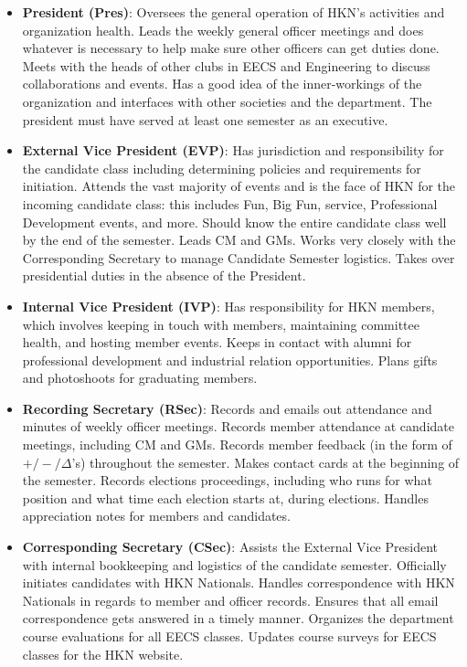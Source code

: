 \documentclass[11pt, article, oneside]{memoir}
\begin{document}
        \begin{itemize}
            \item \textbf{President (Pres)}: Oversees the general operation of HKN's activities and organization health. Leads the weekly general officer meetings and does whatever is necessary to help make sure other officers can get duties done. Meets with the heads of other clubs in EECS and Engineering to discuss collaborations and events. Has a good idea of the inner-workings of the organization and interfaces with other societies and the department. The president must have served at least one semester as an executive.
            \item \textbf{External Vice President (EVP)}: Has jurisdiction and responsibility for the candidate class including determining policies and requirements for initiation. Attends the vast majority of events and is the face of HKN for the incoming candidate class: this includes Fun, Big Fun, service, Professional Development events, and more. Should know the entire candidate class well by the end of the semester. Leads CM and GMs. Works very closely with the Corresponding Secretary to manage Candidate Semester logistics. Takes over presidential duties in the absence of the President.
            \item \textbf{Internal Vice President (IVP)}: Has responsibility for HKN members, which involves keeping in touch with members, maintaining committee health, and hosting member events. Keeps in contact with alumni for professional development and industrial relation opportunities. Plans gifts and photoshoots for graduating members. 
            \item \textbf{Recording Secretary (RSec)}: Records and emails out attendance and minutes of weekly officer meetings. Records member attendance at candidate meetings, including CM and GMs. Records member feedback (in the form of $+/-/\Delta$'s) throughout the semester. Makes contact cards at the beginning of the semester. Records elections proceedings, including who runs for what position and what time each election starts at, during elections. Handles appreciation notes for members and candidates. 
            \item \textbf{Corresponding Secretary (CSec)}: Assists the External Vice President with internal bookkeeping and logistics of the candidate semester. Officially initiates candidates with HKN Nationals. Handles correspondence with HKN Nationals in regards to member and officer records. Ensures that all email correspondence gets answered in a timely manner. Organizes the department course evaluations for all EECS classes. Updates course surveys for EECS classes for the HKN website.

\end{itemize}
\end{document}
